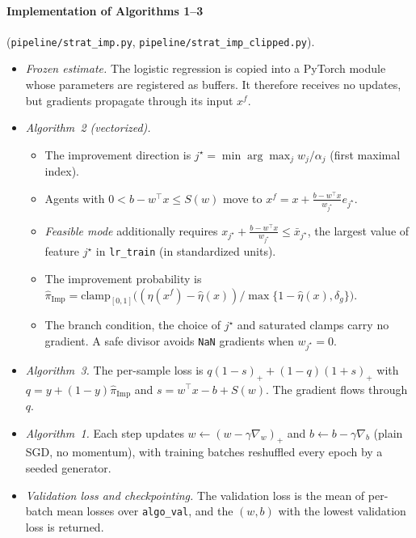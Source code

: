 \paragraph{Implementation of Algorithms 1--3} (\texttt{pipeline/strat\_imp.py},
\texttt{pipeline/strat\_imp\_clipped.py}).
\begin{itemize}
  \item \emph{Frozen estimate.} The logistic regression is copied into a
        PyTorch module whose parameters are registered as buffers. It therefore
        receives no updates, but gradients propagate through its input $x^f$.
  \item \emph{Algorithm~2 (vectorized).}
    \begin{itemize}
      \item The improvement direction is $j^\star=\min\arg\max_j w_j/\alpha_j$
            (first maximal index).
      \item Agents with $0<b-w^\top x\le S(w)$ move to
            $x^f=x+\frac{b-w^\top x}{w_{j^\star}}e_{j^\star}$.
      \item \emph{Feasible mode} additionally requires
            $x_{j^\star}+\frac{b-w^\top x}{w_{j^\star}}\le \bar x_{j^\star}$, the
            largest value of feature $j^\star$ in \texttt{lr\_train} (in
            standardized units).
      \item The improvement probability is
            $\widehat{\pi}_{\mathrm{Imp}}=\mathrm{clamp}_{[0,1]}\big((\widehat{\eta}(x^f)-\widehat{\eta}(x))/\max\{1-\widehat{\eta}(x),\delta_g\}\big)$.
      \item The branch condition, the choice of $j^\star$ and saturated clamps
            carry no gradient. A safe divisor avoids \texttt{NaN} gradients when
            $w_{j^\star}=0$.
    \end{itemize}
  \item \emph{Algorithm~3.} The per-sample loss is
        $q(1-s)_+ + (1-q)(1+s)_+$ with $q=y+(1-y)\widehat{\pi}_{\mathrm{Imp}}$ and
        $s=w^\top x-b+S(w)$. The gradient flows through $q$.
  \item \emph{Algorithm~1.} Each step updates $w\leftarrow(w-\gamma\nabla_w)_+$
        and $b\leftarrow b-\gamma\nabla_b$ (plain SGD, no momentum), with
        training batches reshuffled every epoch by a seeded generator.
  \item \emph{Validation loss and checkpointing.} The validation loss is the
        mean of per-batch mean losses over \texttt{algo\_val}, and the
        $(w,b)$ with the lowest validation loss is returned.
\end{itemize}

